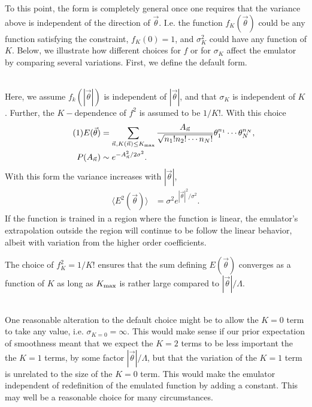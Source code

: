 \documentclass[12pt]{article}
\numberwithin{equation}{section}
\numberwithin{figure}{section}
\newcommand\eqnumber{\addtocounter{equation}{1}\tag{\theequation}}
\begin{document}
To this point, the form is completely general once one requires that the variance above is independent of the direction of $\vec{\theta}$. I.e. the function $f_K(\vec{\theta})$ could be any function satisfying the constraint, $f_K(0)=1$, and $\sigma_K^2$ could have any function of $K$. Below, we illustrate how different choices for $f$ or for $\sigma_K$ affect the emulator by comparing several variations. First, we define the default form.

\\
Here, we assume $f_k(|\vec{\theta}|)$ is independent of $|\vec{\theta}|$, and that $\sigma_K$ is independent of $K$. Further, the $K-$dependence of $f^2$ is assumed to be $1/K!$. With this choice
\begin{align*}\eqnumber
E(\vec{\theta})&=\sum_{\vec{n},K(\vec{n})\le K_{\rm max}}\frac{A_{\vec{n}}}{\sqrt{n_1!n_2!\cdots n_N!}}
\theta_1^{n_1}\cdots\theta_N^{n_N},\\
P(A_{\vec{n}})&\sim e^{-A^2_{\vec{n}}/2\sigma^2}.
\end{align*}
With this form the variance increases with $|\vec{\theta}|$,
\begin{eqnarray}
\langle E^2(\vec{\theta})\rangle&=\sigma^2e^{|\vec{\theta}|^2/\sigma^2}.
\end{eqnarray}
If the function is trained in a region where the function is linear, the emulator's extrapolation outside the region will continue to be follow the linear behavior, albeit with variation from the higher order coefficients.

The choice of $f^2_K=1/K!$ ensures that the sum defining $E(\vec{\theta})$ converges as a function of $K$ as long as $K_{\rm max}$ is rather large compared to $|\vec{\theta}|/\Lambda$. 

\\
One reasonable alteration to the default choice might be to allow the $K=0$ term to take any value, i.e. $\sigma_{K=0}=\infty$. This would make sense if our prior expectation of smoothness meant that we expect the $K=2$ terms to be less important the the $K=1$ terms, by some factor $|\vec{\theta}|/\Lambda$, but that the variation of the $K=1$ term is unrelated to the size of the $K=0$ term. This would make the emulator independent of redefinition of the emulated function by adding a constant. This may well be a reasonable choice for many circumstances.
\end{document}
